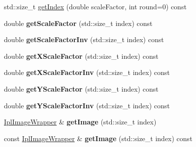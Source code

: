 \begin{DoxyCompactItemize}
\item 
std::size\_\-t \hyperlink{class_ipl_image_pyramid_a079949237facf732d588900b143ed3d6}{getIndex} (double scaleFactor, int round=0) const 
\item 
\hypertarget{class_ipl_image_pyramid_aa3c64a6e98d7359024e981b7e379bcd7}{
double {\bfseries getScaleFactor} (std::size\_\-t index) const }
\label{class_ipl_image_pyramid_aa3c64a6e98d7359024e981b7e379bcd7}

\item 
\hypertarget{class_ipl_image_pyramid_ab80f5de270c3dc4b846fa9a2a837db74}{
double {\bfseries getScaleFactorInv} (std::size\_\-t index) const }
\label{class_ipl_image_pyramid_ab80f5de270c3dc4b846fa9a2a837db74}

\item 
\hypertarget{class_ipl_image_pyramid_a073ae4c7abe797e55c70ffa4474343cd}{
double {\bfseries getXScaleFactor} (std::size\_\-t index) const }
\label{class_ipl_image_pyramid_a073ae4c7abe797e55c70ffa4474343cd}

\item 
\hypertarget{class_ipl_image_pyramid_afc2db4e914022424506122c477d92a10}{
double {\bfseries getXScaleFactorInv} (std::size\_\-t index) const }
\label{class_ipl_image_pyramid_afc2db4e914022424506122c477d92a10}

\item 
\hypertarget{class_ipl_image_pyramid_aa9c48a23c301fffa0f46381e2a8a2099}{
double {\bfseries getYScaleFactor} (std::size\_\-t index) const }
\label{class_ipl_image_pyramid_aa9c48a23c301fffa0f46381e2a8a2099}

\item 
\hypertarget{class_ipl_image_pyramid_af4b9e1c5cac8b5970fb5b2202ed41b44}{
double {\bfseries getYScaleFactorInv} (std::size\_\-t index) const }
\label{class_ipl_image_pyramid_af4b9e1c5cac8b5970fb5b2202ed41b44}

\item 
\hypertarget{class_ipl_image_pyramid_a9dcc5b93cb089a16d235af97b8517ff3}{
\hyperlink{class_ipl_image_wrapper}{IplImageWrapper} \& {\bfseries getImage} (std::size\_\-t index)}
\label{class_ipl_image_pyramid_a9dcc5b93cb089a16d235af97b8517ff3}

\item 
\hypertarget{class_ipl_image_pyramid_a7ce802a2c47c613db18ee7e1e1c5c9fb}{
const \hyperlink{class_ipl_image_wrapper}{IplImageWrapper} \& {\bfseries getImage} (std::size\_\-t index) const }
\label{class_ipl_image_pyramid_a7ce802a2c47c613db18ee7e1e1c5c9fb}


\end{DoxyCompactItemize}

